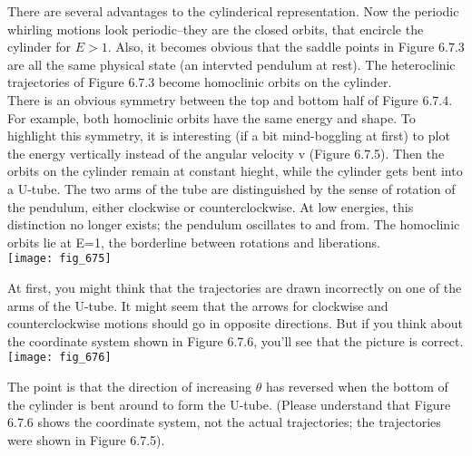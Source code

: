 \documentclass{article}
\newcommand\tab[1][1cm]{\hspace*{#1}}
\begin{document}
There are several advantages to the cylinderical representation. Now the periodic whirling motions look periodic--they are the closed orbits, that encircle the cylinder for $E>1$. Also, it becomes obvious that the saddle points in Figure 6.7.3 are all the same physical state (an intervted pendulum at rest). The heteroclinic trajectories of Figure 6.7.3 become homoclinic orbits on the cylinder. \\ \tab
There is an obvious symmetry between the top and bottom half of Figure 6.7.4. For example, both homoclinic orbits have the same energy and shape. To highlight this symmetry, it is interesting (if a bit mind-boggling at first) to plot the energy vertically instead of the angular velocity v (Figure 6.7.5). Then the orbits on the cylinder remain at constant hieght, while the cylinder gets bent into a U-tube. The two arms of the tube are distinguished by the sense of rotation of the pendulum, either clockwise or counterclockwise. At low energies, this distinction no longer exists; the pendulum oscillates to and from. The homoclinic orbits lie at E=1, the borderline between rotations and liberations. \\ 
\texttt{[image: fig\_675]}

At first, you might think that the trajectories are drawn incorrectly on one of the arms of the U-tube. It might seem that the arrows for clockwise and counterclockwise motions should go in opposite directions. But if you think about the coordinate system shown in Figure 6.7.6, you'll see that the picture is correct. \\ 
\texttt{[image: fig\_676]}

The point is that the direction of increasing $\theta$ has reversed when the bottom of the cylinder is bent around to form the U-tube. (Please understand that Figure 6.7.6 shows the coordinate system, not the actual trajectories; the trajectories were shown in Figure 6.7.5).
\end{document}

